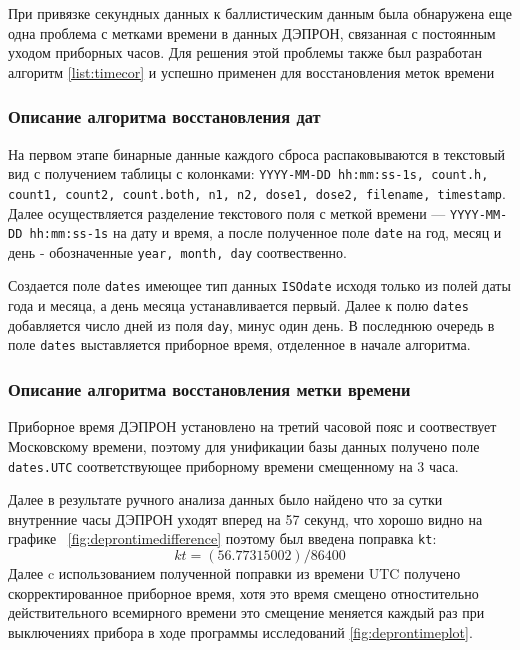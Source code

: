 При привязке секундных данных к баллистическим данным была обнаружена еще одна 
проблема с метками времени в данных 
ДЭПРОН, связанная с постоянным уходом приборных часов. Для решения этой 
проблемы также был разработан алгоритм \ref{list:timecor} и успешно применен 
для восстановления меток времени 

\subsubsection{Описание алгоритма восстановления дат}

На первом этапе  бинарные данные каждого сброса распаковываются в текстовый вид 
с получением таблицы с колонками: \texttt{YYYY-MM-DD hh:mm:ss-1s,	count.h,	
count1,	count2,	count.both,	n1,	n2,	dose1, dose2,	filename,	timestamp}. 
Далее осуществляется разделение текстового поля с меткой времени --- 
\texttt{YYYY-MM-DD hh:mm:ss-1s} на дату и время, а после полученное поле 
\texttt{date} на год, месяц и день - обозначенные \texttt{year, month, day} 
соотвественно.

Создается поле \texttt{dates} имеющее тип данных \texttt{ISOdate} исходя только 
из полей даты года и месяца, а день месяца устанавливается первый. Далее к полю 
\texttt{dates} 
добавляется число дней из поля \texttt{day}, минус один день. В последнюю 
очередь в поле \texttt{dates} выставляется приборное время, отделенное в начале 
алгоритма.

\subsubsection{Описание алгоритма восстановления метки времени}

Приборное время ДЭПРОН установлено на третий часовой пояс и соотвествует 
Московскому 
времени, поэтому для унификации базы данных получено поле \texttt{dates.UTC} 
соответствующее приборному времени смещенному на 3 часа.



Далее в результате ручного анализа данных было найдено что за сутки внутренние 
часы ДЭПРОН уходят вперед на 57 секунд, что хорошо видно на графике~
\ref{fig:deprontimedifference} поэтому был введена поправка \texttt{kt}:
\[ kt = (56.77315002) /86400 \]
Далее c использованием полученной поправки из времени UTC получено 
скорректированное приборное время, хотя это время смещено отностительно 
действительного всемирного времени это смещение меняется каждый раз при 
выключениях прибора в ходе программы исследований \ref{fig:deprontimeplot}. 

